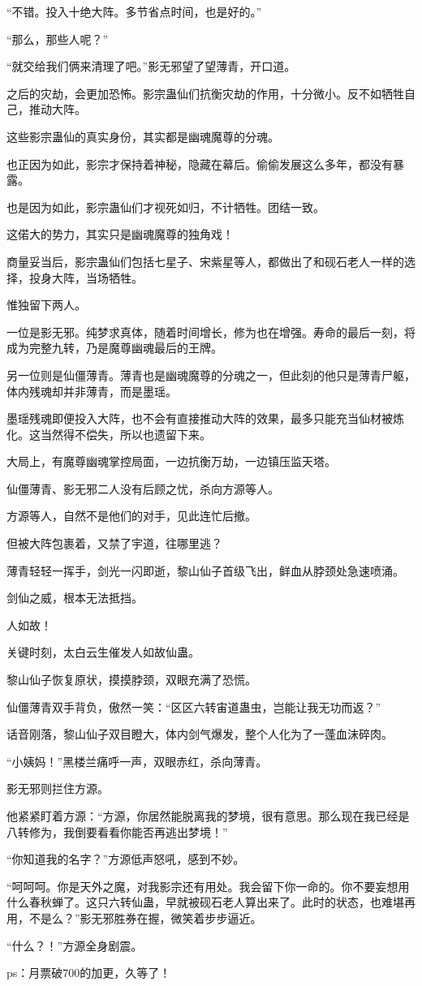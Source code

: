 \begin{this_body}
“不错。投入十绝大阵。多节省点时间，也是好的。”

“那么，那些人呢？”

“就交给我们俩来清理了吧。”影无邪望了望薄青，开口道。

之后的灾劫，会更加恐怖。影宗蛊仙们抗衡灾劫的作用，十分微小。反不如牺牲自己，推动大阵。

这些影宗蛊仙的真实身份，其实都是幽魂魔尊的分魂。

也正因为如此，影宗才保持着神秘，隐藏在幕后。偷偷发展这么多年，都没有暴露。

也是因为如此，影宗蛊仙们才视死如归，不计牺牲。团结一致。

这偌大的势力，其实只是幽魂魔尊的独角戏！

商量妥当后，影宗蛊仙们包括七星子、宋紫星等人，都做出了和砚石老人一样的选择，投身大阵，当场牺牲。

惟独留下两人。

一位是影无邪。纯梦求真体，随着时间增长，修为也在增强。寿命的最后一刻，将成为完整九转，乃是魔尊幽魂最后的王牌。

另一位则是仙僵薄青。薄青也是幽魂魔尊的分魂之一，但此刻的他只是薄青尸躯，体内残魂却并非薄青，而是墨瑶。

墨瑶残魂即便投入大阵，也不会有直接推动大阵的效果，最多只能充当仙材被炼化。这当然得不偿失，所以也遗留下来。

大局上，有魔尊幽魂掌控局面，一边抗衡万劫，一边镇压监天塔。

仙僵薄青、影无邪二人没有后顾之忧，杀向方源等人。

方源等人，自然不是他们的对手，见此连忙后撤。

但被大阵包裹着，又禁了宇道，往哪里逃？

薄青轻轻一挥手，剑光一闪即逝，黎山仙子首级飞出，鲜血从脖颈处急速喷涌。

剑仙之威，根本无法抵挡。

人如故！

关键时刻，太白云生催发人如故仙蛊。

黎山仙子恢复原状，摸摸脖颈，双眼充满了恐慌。

仙僵薄青双手背负，傲然一笑：“区区六转宙道蛊虫，岂能让我无功而返？”

话音刚落，黎山仙子双目瞪大，体内剑气爆发，整个人化为了一蓬血沫碎肉。

“小姨妈！”黑楼兰痛呼一声，双眼赤红，杀向薄青。

影无邪则拦住方源。

他紧紧盯着方源：“方源，你居然能脱离我的梦境，很有意思。那么现在我已经是八转修为，我倒要看看你能否再逃出梦境！”

“你知道我的名字？”方源低声怒吼，感到不妙。

“呵呵呵。你是天外之魔，对我影宗还有用处。我会留下你一命的。你不要妄想用什么春秋蝉了。这只六转仙蛊，早就被砚石老人算出来了。此时的状态，也难堪再用，不是么？”影无邪胜券在握，微笑着步步逼近。

“什么？！”方源全身剧震。

ps：月票破700的加更，久等了！

\end{this_body}

